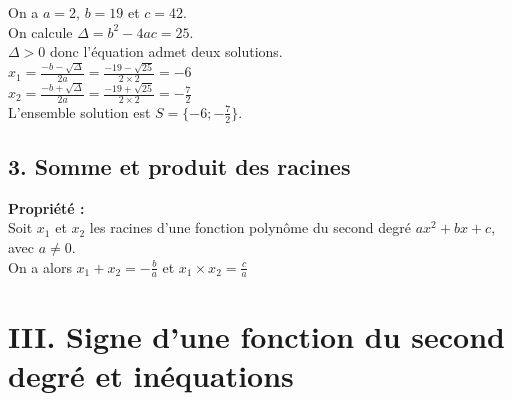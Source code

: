 \documentclass[11pt,a4paper]{article}
\begin{document}
On a $a=2$, $b=19$ et $c=42$. \\
On calcule $\Delta=b^2-4ac=25$. \\
$\Delta>0$ donc l'équation admet deux solutions. \\
$x_1=\frac{-b-\sqrt{\Delta}}{2a}=\frac{-19-\sqrt{25}}{2\times2}=-6$ \\
$x_2=\frac{-b+\sqrt{\Delta}}{2a}=\frac{-19+\sqrt{25}}{2\times2}=-\frac{7}{2}$ \\
L'ensemble solution est $S=\{-6;-\frac{7}{2}\}$. \\

\subsection*{3. Somme et produit des racines}

\begin{mdframed}[style=proprieteStyle]
	\textbf{Propriété :} ~\\
	Soit $x_1$ et $x_2$ les racines d'une fonction polynôme du second degré $ax^2+bx+c$, avec $a\not=0$. \\
	On a alors $x_1+x_2=-\frac{b}{a}$ et $x_1\times x_2=\frac{c}{a}$
\end{mdframed}

\newpage

\section*{III. Signe d'une fonction du second degré et inéquations}
\end{document}
